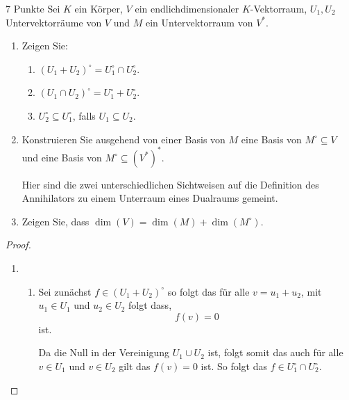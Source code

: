 \documentclass{problemset}
\author{Michael van Straten}
\begin{document}
\maketitle

\begin{problem}{7 Punkte}
Sei $K$ ein Körper, $V$ ein endlichdimensionaler $K$-Vektorraum, $U_1, U_2$
Untervektorräume von $V$ und $M$ ein Untervektorraum von $V^*$.
\begin{enumerate}
    \item Zeigen Sie:
          \begin{enumerate}
              \item $(U_1 + U_2)^\circ = U_1^\circ \cap U_2^\circ$.
              \item $(U_1 \cap U_2)^\circ = U_1^\circ + U_2^\circ$.
              \item $U_2^\circ \subseteq U_1^\circ$, falls $U_1 \subseteq U_2$.
          \end{enumerate}
    \item Konstruieren Sie ausgehend von einer Basis von $M$ eine Basis von $M^\circ
              \subseteq V$ und eine Basis von $M^\circ \subseteq (V^*)^*$.
          \begin{hint}
              Hier sind die zwei unterschiedlichen Sichtweisen auf die Definition des
              Annihilators zu einem Unterraum eines Dualraums gemeint.
          \end{hint}
    \item Zeigen Sie, dass $\dim(V) = \dim(M) + \dim(M^\circ)$.
\end{enumerate}

\begin{proof}
    \leavevmode
    \begin{enumerate}
        \item
              \leavevmode
              \begin{enumerate}
                  \item Sei zunächst \(f \in (U_1 + U_2)^\circ\) so folgt das für alle \(v = u_1 +
                        u_2\), mit \(u_1 \in U_1\) und \(u_2 \in U_2\) folgt dass,
                        \begin{equation}
                            f(v) = 0
                        \end{equation} ist.

                        Da die Null in der Vereinigung \(U_1 \cup U_2\) ist, folgt somit das auch für
                        alle \(v \in U_1\) und \(v \in U_2\) gilt das \(f(v) = 0\) ist. So folgt das
                        \(f \in U_1^\circ \cap U_2^\circ\).


\end{enumerate}
\end{enumerate}
\end{proof}
\end{problem}
\end{document}
